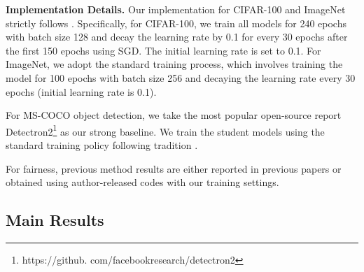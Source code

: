 \documentclass[letterpaper]{article} %
\begin{document}
\noindent\textbf{Implementation Details.} Our implementation for CIFAR-100 and ImageNet strictly follows \cite{chen2021distilling, zhao2022decoupled}. Specifically, for CIFAR-100, we train all models for 240 epochs with batch size 128 and decay the learning rate by 0.1 for every 30 epochs after the first 150 epochs using SGD. The initial learning rate is set to 0.1. For ImageNet, we adopt the standard training process, which involves training the model for 100 epochs with batch size 256 and decaying the learning rate every 30 epochs (initial learning rate is 0.1).

For MS-COCO object detection, we take the most popular open-source report Detectron2\footnote{https://github.
com/facebookresearch/detectron2} as our strong baseline. We train the student models using the standard training policy following tradition \cite{wang2019distilling}. 

For fairness, previous method results are either reported in previous papers or obtained using author-released codes with our training settings.

\subsection{Main Results}
\end{document}
